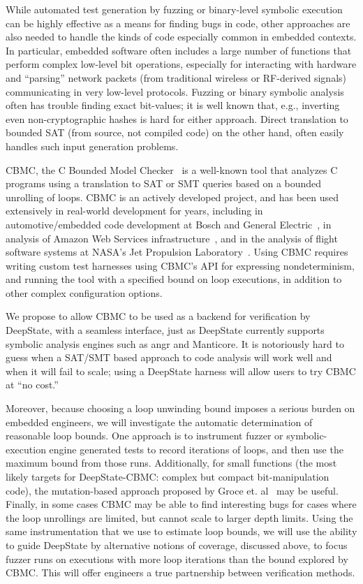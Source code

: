 While automated test generation by fuzzing or binary-level symbolic execution can be highly effective as a means for finding bugs in code, other approaches are also needed to handle the kinds of code especially common in embedded contexts.  In particular, embedded software often includes a large number of functions that perform complex low-level bit operations, especially for interacting with hardware and ``parsing'' network packets (from traditional wireless or RF-derived signals) communicating in very low-level protocols.  Fuzzing or binary symbolic analysis often has trouble  finding exact bit-values; it is well known that, e.g., inverting even non-cryptographic hashes is hard for either approach.  Direct translation to bounded SAT (from source, not compiled code) on the other hand, often easily handles such input generation problems.

CBMC, the C Bounded Model Checker~\cite{cbmcp} is a well-known tool that analyzes C programs using a translation to SAT or SMT queries based on a bounded unrolling of loops. CBMC is an actively developed project, and has been used extensively in real-world development for years, including in automotive/embedded code development at Bosch and General Electric~\cite{tiemeyer2019crest}, in analysis of Amazon Web Services infrastructure~\cite{awsmodel}, and in the analysis of flight software systems at NASA's Jet Propulsion Laboratory~\cite{AMAI}.  Using CBMC requires writing custom test harnesses using CBMC's API for expressing nondeterminism, and running the tool with a specified bound on loop executions, in addition to other complex configuration options.

We propose to allow CBMC to be used as a backend for verification by DeepState, with a seamless interface, just as DeepState currently supports symbolic analysis engines such as angr and Manticore.  It is notoriously hard to guess when a SAT/SMT based approach to code analysis will work well and when it will fail to scale; using a DeepState harness will allow users to try CBMC at ``no cost.''

Moreover, because choosing a loop unwinding bound imposes a serious burden on embedded engineers, we will investigate the automatic determination of reasonable loop bounds.  One approach is to instrument fuzzer or symbolic-execution engine generated tests to record iterations of loops, and then use the maximum bound from those runs.  Additionally, for small functions (the most likely targets for DeepState-CBMC: complex but compact bit-manipulation code), the mutation-based approach proposed by Groce et. al~\cite{groce2018verified} may be useful.  Finally, in some cases CBMC may be able to find interesting bugs for cases where the loop unrollings are limited, but cannot scale to larger depth limits.  Using the same instrumentation that we use to estimate loop bounds, we will use the ability to guide DeepState by alternative notions of coverage, discussed above, to focus fuzzer runs on executions with more loop iterations than the bound explored by CBMC.  This will offer engineers a true partnership between verification methods. 